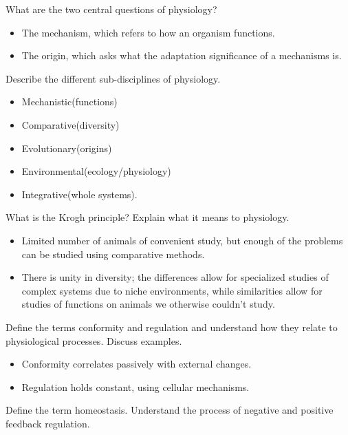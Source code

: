 \documentclass[12pt,a4paper]{article}
\begin{document}
\begin{itemize}
    {\color{G-Moon}\item What are the two central questions of physiology? }
        \begin{itemize}
            \item The mechanism, which refers to how an organism functions.
            \item The origin, which asks what the adaptation significance of a mechanisms is.
        \end{itemize}
    {\color{G-Moon}\item Describe the different sub-disciplines of physiology.}
        \begin{itemize}
            \item Mechanistic(functions)
            \item Comparative(diversity)
            \item Evolutionary(origins)
            \item Environmental(ecology/physiology)
            \item Integrative(whole systems).
        \end{itemize}
    {\color{G-Moon}\item What is the Krogh principle? Explain what it means to physiology.}
        \begin{itemize}
            \item Limited number of animals of convenient study, but enough of the problems can be studied using comparative methods.
            \item There is unity in diversity; the differences allow for specialized studies of complex systems due to niche environments, while similarities allow for studies of functions on animals we otherwise couldn't study.
        \end{itemize}
    {\color{G-Moon}\item Define the terms conformity and regulation and understand how they relate to physiological processes. Discuss examples.}
        \begin{itemize}
            \item Conformity correlates passively with external changes.
            \item Regulation holds constant, using cellular mechanisms.
        \end{itemize}
    {\color{G-Moon}\item Define the term homeostasis. Understand the process of negative and positive feedback regulation.}

\end{itemize}
\end{document}
